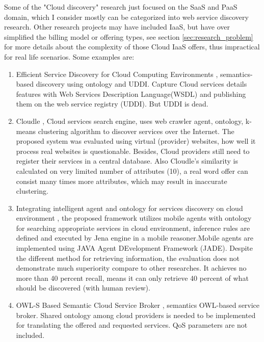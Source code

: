 Some of the "Cloud discovery" research just focused on the SaaS and PaaS domain, which I consider mostly can be categorized into web service discovery research. Other research projects may have included IaaS, but have over simplified the billing model or offering types, see section \ref{sec:research_problem} for more details about the complexity of those Cloud IaaS offers, thus impractical for real life scenarios. Some examples are:

\begin{enumerate}
    \item  
    Efficient Service Discovery for Cloud Computing Environments
    \cite{EfficientServiceDiscoveryforCloudComputingEnvironments}, 
    semantics-based discovery using ontology and UDDI. Capture Cloud services details features with Web Services Description Language(WSDL) and publishing them on the web service registry (UDDI).
    But UDDI is dead.
    \item
    Cloudle \cite{Cloudle, CloudleAgent-BasedCloudComputing}, Cloud services search engine, uses web crawler agent, ontology, k-means clustering algorithm to discover services over the Internet. 
    The proposed system was evaluated using virtual (provider) websites, how well it process real websites is questionable. Besides, Cloud providers still need to register their services in a central database. Also Cloudle's similarity is calculated on very limited number of attributes (10), a real word offer can consist many times more attributes, which may result in inaccurate clustering.
    \item
    Integrating intelligent agent and ontology for services discovery on cloud environment
    \cite{IntelligentAgentOntologyServicesDiscovery}, the proposed framework utilizes mobile agents with ontology for searching appropriate services in cloud environment, inference rules are defined and executed by Jena engine \cite{jena} in a mobile reasoner.Mobile agents are implemented using JAVA Agent DEvelopment Framework (JADE).
    Despite the different method for retrieving information, the evaluation does not demonstrate much superiority compare to other researches. It achieves no more than 40 percent recall, means it can only retrieve 40 percent of what should be discovered (with human review).
    \item
    OWL-S Based Semantic Cloud Service Broker \cite{OWL-CloudServiceBroker}, semantics OWL-based service broker.
    Shared ontology among cloud providers is needed to be implemented for translating the offered and requested services. QoS parameters are not included.

\end{enumerate}
